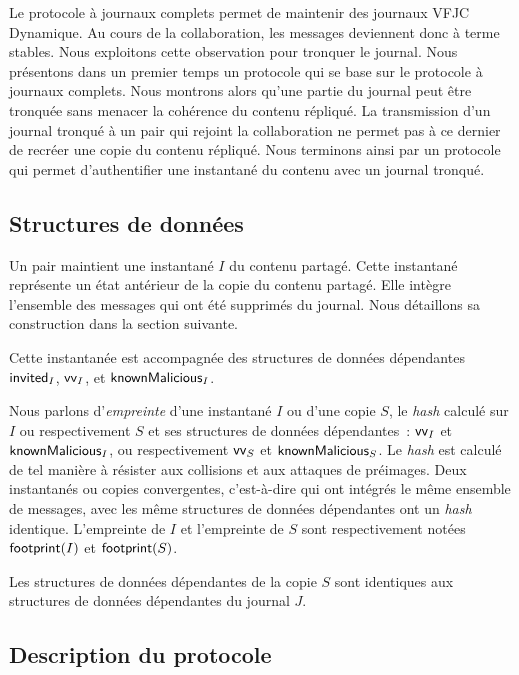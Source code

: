Le protocole à journaux complets permet de maintenir des journaux \acl{VFJC} Dynamique.
Au cours de la collaboration, les messages deviennent donc à terme stables.
Nous exploitons cette observation pour tronquer le journal.
Nous présentons dans un premier temps un protocole qui se base sur le protocole à journaux complets.
Nous montrons alors qu'une partie du journal peut être tronquée sans menacer la cohérence du contenu répliqué.
La transmission d'un journal tronqué à un pair qui rejoint la collaboration ne permet pas à ce dernier de recréer une copie du contenu répliqué.
Nous terminons ainsi par un protocole qui permet d'authentifier une instantané du contenu avec un journal tronqué.

\subsection{Structures de données}

Un pair maintient une instantané $I$ du contenu partagé.
Cette instantané représente un état antérieur de la copie du contenu partagé.
Elle intègre l'ensemble des messages qui ont été supprimés du journal.
Nous détaillons sa construction dans la section suivante.

Cette instantanée est accompagnée des structures de données dépendantes $\operatorname{\mathsf{invited}}_I$, $\operatorname{\mathsf{vv}}_I$, et $\operatorname{\mathsf{knownMalicious}}_I$.


Nous parlons d'\emph{empreinte} d'une instantané $I$ ou d'une copie $S$, le \emph{hash} calculé sur $I$ ou respectivement $S$ et ses structures de données dépendantes~: $\operatorname{\mathsf{vv}}_I$ et $\operatorname{\mathsf{knownMalicious}}_I$, ou respectivement $\operatorname{\mathsf{vv}}_S$ et $\operatorname{\mathsf{knownMalicious}}_S$.
Le \emph{hash} est calculé de tel manière à résister aux collisions et aux attaques de préimages.
Deux instantanés ou copies convergentes, c'est-à-dire qui ont intégrés le même ensemble de messages, avec les même structures de données dépendantes ont un \emph{hash} identique.
L'empreinte de $I$ et l'empreinte de $S$ sont respectivement notées $\operatorname{\mathsf{footprint}}(I)$ et $\operatorname{\mathsf{footprint}}(S)$.

Les structures de données dépendantes de la copie $S$ sont identiques aux structures de données dépendantes du journal $J$.


\subsection{Description du protocole}

